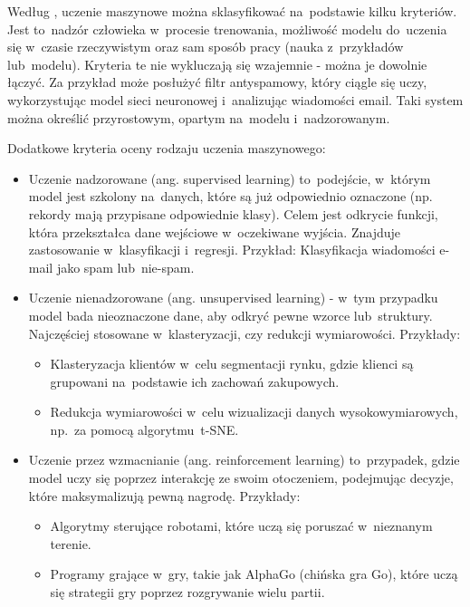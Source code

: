 Według \cite{Geron2020}, uczenie maszynowe można sklasyfikować na~podstawie kilku kryteriów.
Jest to~nadzór człowieka w~procesie trenowania, możliwość modelu do~uczenia się w~czasie rzeczywistym
oraz sam sposób pracy (nauka z~przykładów lub~modelu). Kryteria te nie wykluczają się wzajemnie - można je dowolnie łączyć.
Za przykład może posłużyć filtr antyspamowy, który ciągle się uczy,
wykorzystując model sieci neuronowej i~analizując wiadomości email.
Taki system można określić przyrostowym, opartym na~modelu i~nadzorowanym.

Dodatkowe kryteria oceny rodzaju uczenia maszynowego:
\begin{itemize}[label=-,labelsep=0.4cm,leftmargin=0.6cm]
    \item Uczenie nadzorowane (ang. supervised learning) to~podejście, w~którym model jest szkolony na~danych,
        które są już odpowiednio oznaczone (np. rekordy mają przypisane odpowiednie klasy).
        Celem jest odkrycie funkcji, która przekształca dane wejściowe w~oczekiwane wyjścia.
        Znajduje zastosowanie w~klasyfikacji i~regresji.
        Przykład: Klasyfikacja wiadomości e-mail jako spam lub~nie-spam.
    \item Uczenie nienadzorowane (ang. unsupervised learning)
        - w~tym przypadku model bada nieoznaczone dane, aby odkryć pewne wzorce lub~struktury.
        Najczęściej stosowane w~klasteryzacji, czy redukcji wymiarowości. Przykłady:
        \begin{itemize}[label=*,labelsep=0.4cm,leftmargin=0.8cm]
            \item Klasteryzacja klientów w~celu segmentacji rynku, gdzie klienci są grupowani na~podstawie ich zachowań zakupowych. 
            \item Redukcja wymiarowości w~celu wizualizacji danych wysokowymiarowych, \\ np.~za pomocą algorytmu~t-SNE.
        \end{itemize}
    \item Uczenie przez wzmacnianie (ang. reinforcement learning) to~przypadek,
        gdzie model uczy się poprzez interakcję ze swoim otoczeniem,
        podejmując decyzje, które maksymalizują pewną nagrodę. Przykłady:
        \begin{itemize}[label=*,labelsep=0.4cm,leftmargin=0.8cm]
            \item Algorytmy sterujące robotami, które uczą się poruszać w~nieznanym terenie. 
            \item Programy grające w~gry, takie jak AlphaGo (chińska gra Go), które uczą się strategii gry poprzez rozgrywanie wielu partii.
        \end{itemize}
\end{itemize}